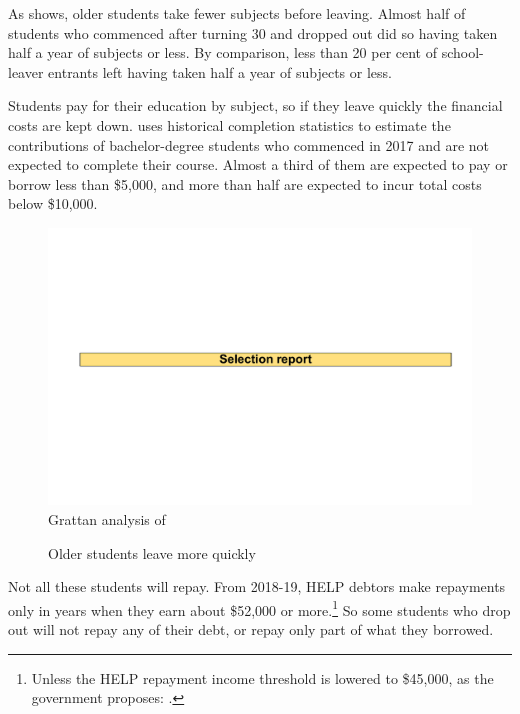 As  shows, older students take fewer subjects before leaving. Almost half of students who commenced after turning 30 and dropped out did so having taken half a year of subjects or less. By comparison, less than 20 per cent of school-leaver entrants left having taken half a year of subjects or less.

Students pay for their education by subject, so if they leave quickly the financial costs are kept down.  uses historical completion statistics to estimate the contributions of bachelor-degree students who commenced in 2017 and are not expected to complete their course. Almost a third of them are expected to pay or borrow less than \$5,000, and more than half are expected to incur total costs below \$10,000.


                \begin{figure}
                    \caption{Older students leave more quickly\label{fig:7}}%
                    \includegraphics[page=10]{atlas/selection_chartdeck.pdf} 
                    {Grattan analysis of \textcite{DepartmentofEducationandTraininga}}
                \end{figure}




Not all these students will repay. From 2018-19, HELP debtors make repayments only in years when they earn about \$52,000 or more.\footnote{Unless the HELP repayment income threshold is lowered to \$45,000, as the government proposes: \textcite{AustralianGovernment2017b}.} So some students who drop out will not repay any of their debt, or repay only part of what they borrowed.

